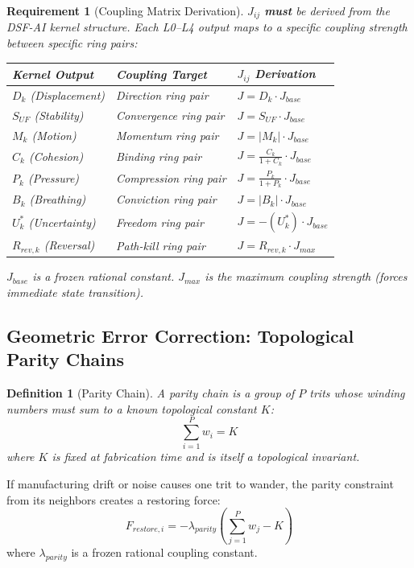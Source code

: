 \documentclass[11pt, a4paper]{article}
\newtheorem{definition}{Definition}[section]
\newtheorem{requirement}{Requirement}[section]
\begin{document}
\begin{requirement}[Coupling Matrix Derivation]
$J_{ij}$ \textbf{must} be derived from the DSF-AI kernel structure. Each
L0--L4 output maps to a specific coupling strength between specific ring
pairs:
\begin{center}
\begin{tabular}{@{}lll@{}}
\toprule
\textbf{Kernel Output} & \textbf{Coupling Target} & \textbf{$J_{ij}$ Derivation} \\
\midrule
$D_k$ (Displacement) & Direction ring pair & $J = D_k \cdot J_{base}$ \\
$S_{UF}$ (Stability) & Convergence ring pair & $J = S_{UF} \cdot J_{base}$ \\
$M_k$ (Motion) & Momentum ring pair & $J = |M_k| \cdot J_{base}$ \\
$C_k$ (Cohesion) & Binding ring pair & $J = \frac{C_k}{1+C_k} \cdot J_{base}$ \\
$P_k$ (Pressure) & Compression ring pair & $J = \frac{P_k}{1+P_k} \cdot J_{base}$ \\
$B_k$ (Breathing) & Conviction ring pair & $J = |B_k| \cdot J_{base}$ \\
$U^*_k$ (Uncertainty) & Freedom ring pair & $J = -(U^*_k) \cdot J_{base}$ \\
$R_{rev,k}$ (Reversal) & Path-kill ring pair & $J = R_{rev,k} \cdot J_{max}$ \\
\bottomrule
\end{tabular}
\end{center}
$J_{base}$ is a frozen rational constant. $J_{max}$ is the maximum coupling
strength (forces immediate state transition).
\end{requirement}

\subsection{Geometric Error Correction: Topological Parity Chains}

\begin{definition}[Parity Chain]
A parity chain is a group of $P$ trits whose winding numbers must sum
to a known topological constant $K$:
\begin{equation}
  \sum_{i=1}^{P} w_i = K
  \label{eq:parity}
\end{equation}
where $K$ is fixed at fabrication time and is itself a topological invariant.
\end{definition}

If manufacturing drift or noise causes one trit to wander, the parity
constraint from its neighbors creates a restoring force:
\begin{equation}
  F_{restore,i} = -\lambda_{parity} \left( \sum_{j=1}^{P} w_j - K \right)
  \label{eq:parity-force}
\end{equation}
where $\lambda_{parity}$ is a frozen rational coupling constant.
\end{document}
